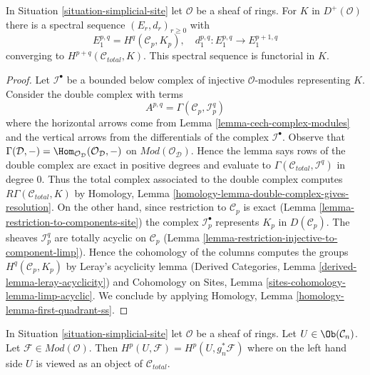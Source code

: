 \begin{lemma}
\label{lemma-simplicial-module-cohomology-site}
In Situation \ref{situation-simplicial-site} let $\mathcal{O}$
be a sheaf of rings. For $K$ in $D^+(\mathcal{O})$
there is a spectral sequence $(E_r, d_r)_{r \geq 0}$ with
$$
E_1^{p, q} = H^q(\mathcal{C}_p, K_p),\quad
d_1^{p, q} : E_1^{p, q} \to E_1^{p + 1, q}
$$
converging to $H^{p + q}(\mathcal{C}_{total}, K)$.
This spectral sequence is functorial in $K$.
\end{lemma}

\begin{proof}
Let $\mathcal{I}^\bullet$ be a bounded below complex of injective
$\mathcal{O}$-modules representing $K$. Consider the double complex with terms
$$
A^{p, q} = \Gamma(\mathcal{C}_p, \mathcal{I}^q_p)
$$
where the horizontal arrows come from
Lemma \ref{lemma-cech-complex-modules}
and the vertical arrows from the differentials of the
complex $\mathcal{I}^\bullet$. Observe that
$\Gamma(\mathcal{D}, -) =
\Hom_{\mathcal{O}_\mathcal{D}}(\mathcal{O}_\mathcal{D}, -)$
on $\textit{Mod}(\mathcal{O}_\mathcal{D})$. Hence the lemma
says rows of the double complex are exact
in positive degrees and evaluate to
$\Gamma(\mathcal{C}_{total}, \mathcal{I}^q)$ in degree $0$.
Thus the total complex associated to the double complex
computes $R\Gamma(\mathcal{C}_{total}, K)$ by
Homology, Lemma \ref{homology-lemma-double-complex-gives-resolution}.
On the other hand, since restriction to $\mathcal{C}_p$ is exact
(Lemma \ref{lemma-restriction-to-components-site})
the complex $\mathcal{I}_p^\bullet$ represents $K_p$ in
$D(\mathcal{C}_p)$. The sheaves $\mathcal{I}_p^q$
are totally acyclic on $\mathcal{C}_p$
(Lemma \ref{lemma-restriction-injective-to-component-limp}).
Hence the cohomology of the columns computes the groups
$H^q(\mathcal{C}_p, K_p)$ by Leray's acyclicity lemma
(Derived Categories, Lemma \ref{derived-lemma-leray-acyclicity})
and
Cohomology on Sites, Lemma \ref{sites-cohomology-lemma-limp-acyclic}.
We conclude by applying
Homology, Lemma \ref{homology-lemma-first-quadrant-ss}.
\end{proof}

\begin{lemma}
\label{lemma-sanity-check-modules}
In Situation \ref{situation-simplicial-site} let $\mathcal{O}$
be a sheaf of rings. Let $U \in \Ob(\mathcal{C}_n)$. Let
$\mathcal{F} \in \textit{Mod}(\mathcal{O})$.
Then $H^p(U, \mathcal{F}) = H^p(U, g_n^*\mathcal{F})$
where on the left hand side $U$ is viewed as an object of
$\mathcal{C}_{total}$.
\end{lemma}

